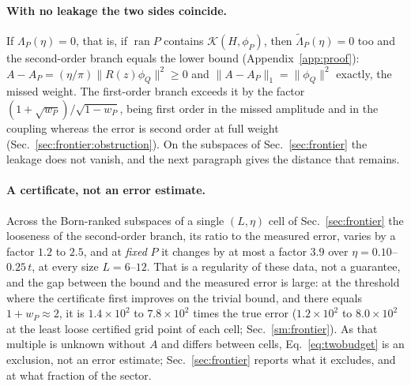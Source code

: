 \paragraph{With no leakage the two sides coincide.} If $\Lambda_P(\eta)=0$, that is, if
$\operatorname{ran}P$ contains $\mathcal K(H,\phi_P)$, then $\tilde\Lambda_P(\eta)=0$ too and the second-order
branch equals the lower bound (Appendix~\ref{app:proof}):
$A-A_P=(\eta/\pi)\lVert R(z)\phi_Q\rVert^{2}\ge0$ and $\lVert A-A_P\rVert_{1}=\lVert\phi_Q\rVert^{2}$
exactly, the missed weight. The first-order branch exceeds it by the factor
$(1+\sqrt{w_P})/\sqrt{1-w_P}$, being first order in the missed amplitude and in the
coupling whereas the error is second order at full weight (Sec.~\ref{sec:frontier:obstruction}).
On the subspaces of Sec.~\ref{sec:frontier} the leakage does not vanish, and the next paragraph gives the
distance that remains.

%
%
%
%
%
%
%
%
%
%
%
%
%
%
%
%
%
%
%
%
%
%
%
%
%
%
%
\paragraph{A certificate, not an error estimate.} Across the Born-ranked subspaces of a single $(L,\eta)$ cell
of Sec.~\ref{sec:frontier} the looseness of the second-order branch, its ratio to the measured error, varies by a
factor $1.2$ to $2.5$, and at \emph{fixed} $P$ it changes by at most a factor $3.9$ over $\eta=0.10$--$0.25\,t$,
at every size $L=6$--$12$. That is a regularity of these data, not a guarantee, and the gap between the bound
and the measured error is large: at the threshold where the certificate first improves on the trivial bound, and
there equals $1+w_P\approx2$, it is $1.4\times10^{2}$ to $7.8\times10^{2}$ times the true error
($1.2\times10^{2}$ to $8.0\times10^{2}$ at the least loose certified grid point of each cell;
Sec.~\ref{sm:frontier}). As that multiple is unknown without $A$ and differs between cells,
Eq.~\eqref{eq:twobudget} is an exclusion, not an error estimate; Sec.~\ref{sec:frontier} reports what it excludes, and at what fraction of the sector.

